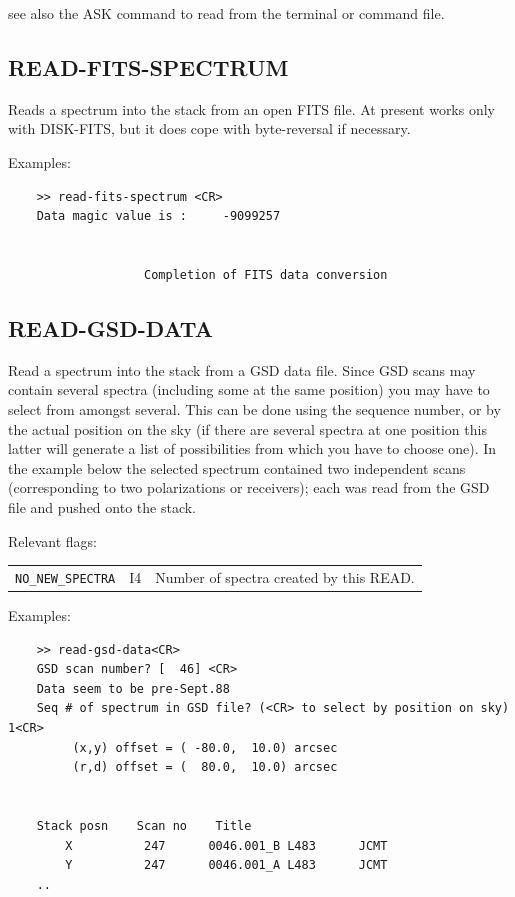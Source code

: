 \documentclass[11pt,twoside]{report}
\begin{document}
see also the ASK command to read from the terminal or command file.

\subsection{READ-FITS-SPECTRUM} 

Reads a spectrum into the stack from an open FITS file. At present works
only with DISK-FITS, but it does cope with byte-reversal if necessary.

Examples:
\begin{verbatim}
    >> read-fits-spectrum <CR>
    Data magic value is :     -9099257


                   Completion of FITS data conversion

\end{verbatim}

\subsection{READ-GSD-DATA} 

Read a spectrum into the stack from a GSD data file. Since GSD scans may
contain several spectra (including some at the same position) you may have
to select from amongst several. This can be done using the sequence number,
or by the actual position on the sky (if there are several spectra at one
position this latter will generate a list of possibilities from which you
have to choose one). In the example below the selected spectrum contained
two independent scans (corresponding to two polarizations or receivers);
each was read from the GSD file and pushed onto the stack.

Relevant flags:\\
\begin{tabular}{lll}
  \verb+NO_NEW_SPECTRA+ & I4 & Number of spectra created by this READ.
\end{tabular}

Examples:
\begin{verbatim}
    >> read-gsd-data<CR>
    GSD scan number? [  46] <CR>
    Data seem to be pre-Sept.88
    Seq # of spectrum in GSD file? (<CR> to select by position on sky) 1<CR>
         (x,y) offset = ( -80.0,  10.0) arcsec
         (r,d) offset = (  80.0,  10.0) arcsec


    Stack posn    Scan no    Title
        X          247      0046.001_B L483      JCMT 
        Y          247      0046.001_A L483      JCMT 
    ..
\end{verbatim}
\end{document}
